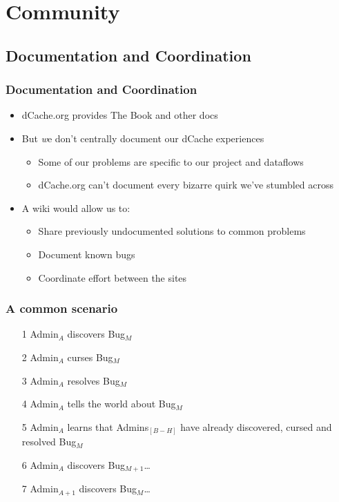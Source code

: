 \documentclass{beamer}
\begin{document}
\section{Community}
\subsection{Documentation and Coordination}
\begin{frame}
\frametitle{Documentation and Coordination}
\begin{itemize}
    \item dCache.org provides The Book and other docs
    \item But {\emph we} don't centrally document our dCache experiences
    \begin{itemize}
        \item Some of our problems are specific to our project and dataflows
        \item dCache.org can't document every bizarre quirk we've stumbled across
    \end{itemize}
    \item A wiki would allow us to:
    \begin{itemize}
        \item Share previously undocumented solutions to common problems
        \item Document known bugs
        \item Coordinate effort between the sites
    \end{itemize}
\end{itemize}


\end{frame}

\begin{frame}
\frametitle{A common scenario}
\begin{itemize}
    \item[1] Admin\ensuremath{_A} discovers Bug\ensuremath{_M}
    \item[2] Admin\ensuremath{_A} curses Bug\ensuremath{_M}
    \item[3] Admin\ensuremath{_A} resolves Bug\ensuremath{_M}
    \item[4] Admin\ensuremath{_A} tells the world about Bug\ensuremath{_M}
    \item[5] Admin\ensuremath{_A} learns that Admins\ensuremath{_{[B-H]}} have already discovered, cursed and resolved Bug\ensuremath{_M}
    \item[6] Admin\ensuremath{_A} discovers Bug\ensuremath{_{M+1}}\dots{}
    \item[7] Admin\ensuremath{_{A+1}} discovers Bug\ensuremath{_M}\dots{}
\end{itemize}


\end{frame}
\end{document}
